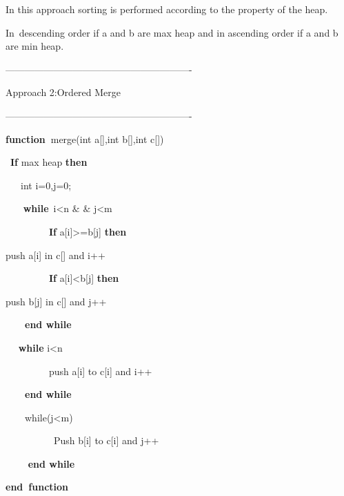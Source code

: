 \documentclass[12pt]{article}
\renewcommand{\_}{\kern-1.5pt\textunderscore\kern-1.5pt}
\begin{document}
\begin{multicols}{2}
\begin{enumerate}
In this approach sorting is performed according to the property of the heap.\par

In\ descending order  if a and b are max heap and in ascending order if a and b are min heap.\par

----------------------------------------------------------\par

Approach 2:Ordered Merge\par

----------------------------------------------------------\par

\textbf{function\  }merge(int a[],int b[],int c[])\par

\  \textbf{If }max heap \textbf{then}\par

\ \  \textbf{\  }int i=0,j=0;\par

\ \ \  \textbf{ while}\  i<n $\&$ $\&$  j<m\par

\ \ \ \ \ \ \ \ \  \textbf{If} a[i]>=b[j] \textbf{then}\par

\tab push a[i] in c[] and i++\par

\ \ \ \ \ \ \ \ \  \textbf{If} a[i]<b[j] \textbf{then}\par

\tab push b[j] in c[] and j++\par

\ \ \ \  \textbf{end while}\par

\ \  \textbf{ while} i<n\par

\ \ \ \ \ \ \ \ \  push a[i] to c[i] and i++\par

\ \ \ \  \textbf{end while}\par

\ \ \ \  while(j<m)\par

\ \ \ \ \ \ \ \ \ \  Push b[i] to c[i] and j++\par

\ \ \ \  \textbf{ end while}\par

\textbf{end\  function}\par


\end{enumerate}
\end{multicols}
\end{document}
